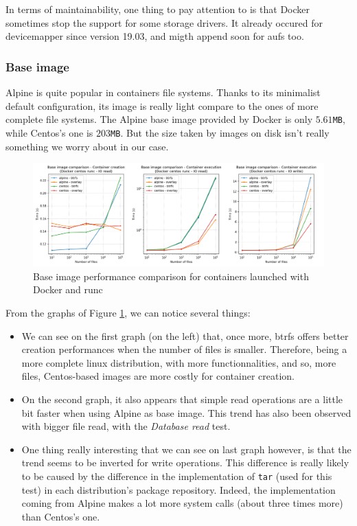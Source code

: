 In terms of maintainability, one thing to pay attention to is that Docker sometimes stop the support for some storage drivers.  It already occured for devicemapper since version 19.03, and migth append soon for aufs too.

\subsubsection{Base image}

Alpine is quite popular in containers file systems.  Thanks to its minimalist default configuration, its image is really light compare to the ones of more complete file systems.  The Alpine base image provided by Docker is only $5.61$\texttt{MB}, while Centos's one is $203$\texttt{MB}.  But the size taken by images on disk isn't really something we worry about in our case.

\begin{figure}[h!]
  \begin{center}
    \includegraphics[width=\linewidth]{images/question-1-base-image.png}
    \caption{Base image performance comparison for containers launched with Docker and runc}
    \label{fig:q1:base-image}
  \end{center}
\end{figure}

From the graphs of Figure \ref{fig:q1:base-image}, we can notice several things:
\begin{itemize}
  \item We can see on the first graph (on the left) that, once more, btrfs offers better creation performances when the number of files is smaller.  Therefore, being a more complete linux distribution, with more functionnalities, and so, more files, Centos-based images are more costly for container creation.
  \item On the second graph, it also appears that simple read operations are a little bit faster when using Alpine as base image.  This trend has also been observed with bigger file read, with the \textit{Database read} test.
  \item One thing really interesting that we can see on last graph however, is that the trend seems to be inverted for write operations.  This difference is really likely to be caused by the difference in the implementation of \texttt{tar} (used for this test) in each distribution's package repository.  Indeed, the implementation coming from Alpine makes a lot more system calls (about three times more) than Centos's one.
\end{itemize}

